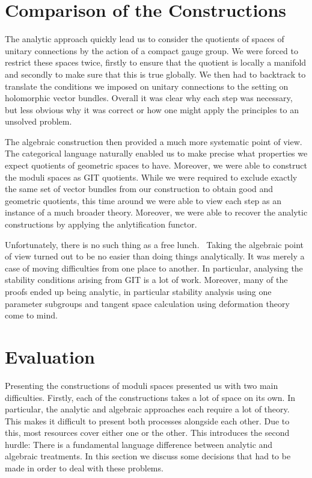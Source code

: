 \documentclass[12pt]{ociamthesis}  %
\begin{document}
\section{Comparison of the Constructions}

The analytic approach
quickly lead us to consider the quotients of spaces of unitary connections
by the action of a compact gauge group. We were forced to restrict these
spaces twice, firstly to ensure that the quotient is locally a manifold
and secondly to make sure that this is true globally. We then had to
backtrack to translate the conditions we imposed on unitary connections
to the setting on holomorphic vector bundles. Overall it was clear
why each step was necessary, but less obvious why it was correct or
how one might apply the principles to an unsolved problem.

The algebraic construction then provided a much more systematic
point of view. The categorical language naturally enabled us to make
precise what properties we expect quotients of geometric spaces to
have. Moreover, we were able to construct the moduli spaces as GIT
quotients. While we were required to exclude exactly the same set of
vector bundles from our construction to obtain good and geometric
quotients, this time around we were able to view each step as an
instance of a much broader theory. Moreover, we were able to recover
the analytic constructions by applying the anlytification functor.

Unfortunately, there is no such thing as a free lunch.~\cite{friedman1977}
Taking the algebraic point of view turned out to be no easier than
doing things analytically. It was merely a case of moving difficulties
from one place to another. In particular, analysing the stability
conditions arising from GIT is a lot of work.
Moreover, many of the proofs ended up being analytic, in particular
stability analysis using one parameter subgroups
and tangent space calculation using deformation theory come to mind.

\section{Evaluation}

Presenting the constructions of moduli spaces presented us with two main
difficulties. Firstly, each of the constructions takes a lot of space on its
own. In particular, the analytic and algebraic approaches each
require a lot of theory. This makes it difficult to present both
processes alongside each other. Due to this, most resources cover
either one or the other. This introduces the second hurdle: There is a
fundamental language difference between analytic and algebraic treatments.
In this section we discuss some decisions that had to be made in
order to deal with these problems.
\end{document}
